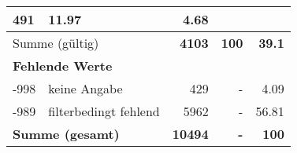 \begin{longtable}{lXrrr}
       \num{491} &
       \num[round-mode=places,round-precision=2]{11.97} &
         \num[round-mode=places,round-precision=2]{4.68} \\
     \midrule
     \multicolumn{2}{l}{Summe (gültig)} &
       \textbf{\num{4103}} &
     \textbf{\num{100}} &
       \textbf{\num[round-mode=places,round-precision=2]{39.1}} \\
     \multicolumn{5}{l}{\textbf{Fehlende Werte}}\\
       -998 &
       keine Angabe &
         \num{429} &
        - &
         \num[round-mode=places,round-precision=2]{4.09} \\
       -989 &
       filterbedingt fehlend &
         \num{5962} &
        - &
         \num[round-mode=places,round-precision=2]{56.81} \\
     \midrule
     \multicolumn{2}{l}{\textbf{Summe (gesamt)}} &
          \textbf{\num{10494}} &
        \textbf{-} &
        \textbf{\num{100}} \\
     \bottomrule
     \end{longtable}
     
